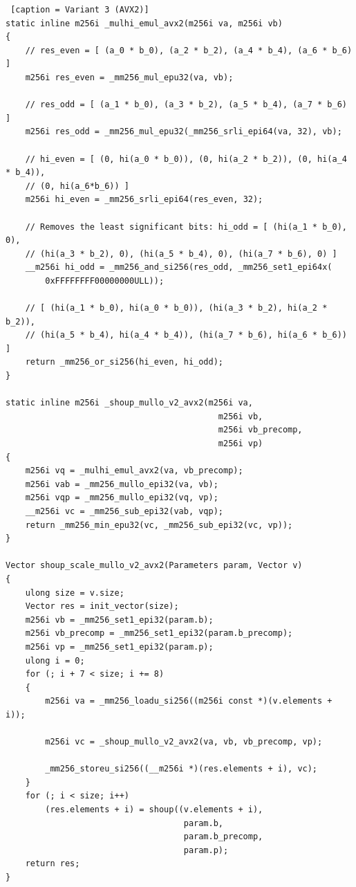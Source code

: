 \documentclass{article}
\begin{document}
\begin{lstlisting} [caption = Variant 3 (AVX2)]
static inline m256i _mulhi_emul_avx2(m256i va, m256i vb)
{
    // res_even = [ (a_0 * b_0), (a_2 * b_2), (a_4 * b_4), (a_6 * b_6) ]
    m256i res_even = _mm256_mul_epu32(va, vb);

    // res_odd = [ (a_1 * b_0), (a_3 * b_2), (a_5 * b_4), (a_7 * b_6) ]
    m256i res_odd = _mm256_mul_epu32(_mm256_srli_epi64(va, 32), vb);

    // hi_even = [ (0, hi(a_0 * b_0)), (0, hi(a_2 * b_2)), (0, hi(a_4 * b_4)),
    // (0, hi(a_6*b_6)) ]
    m256i hi_even = _mm256_srli_epi64(res_even, 32);

    // Removes the least significant bits: hi_odd = [ (hi(a_1 * b_0), 0),
    // (hi(a_3 * b_2), 0), (hi(a_5 * b_4), 0), (hi(a_7 * b_6), 0) ]
    __m256i hi_odd = _mm256_and_si256(res_odd, _mm256_set1_epi64x(
        0xFFFFFFFF00000000ULL));

    // [ (hi(a_1 * b_0), hi(a_0 * b_0)), (hi(a_3 * b_2), hi(a_2 * b_2)),
    // (hi(a_5 * b_4), hi(a_4 * b_4)), (hi(a_7 * b_6), hi(a_6 * b_6)) ]
    return _mm256_or_si256(hi_even, hi_odd);
}

static inline m256i _shoup_mullo_v2_avx2(m256i va,
                                           m256i vb,
                                           m256i vb_precomp,
                                           m256i vp)
{
    m256i vq = _mulhi_emul_avx2(va, vb_precomp);
    m256i vab = _mm256_mullo_epi32(va, vb);
    m256i vqp = _mm256_mullo_epi32(vq, vp);
    __m256i vc = _mm256_sub_epi32(vab, vqp);
    return _mm256_min_epu32(vc, _mm256_sub_epi32(vc, vp));
}

Vector shoup_scale_mullo_v2_avx2(Parameters param, Vector v)
{
    ulong size = v.size;
    Vector res = init_vector(size);
    m256i vb = _mm256_set1_epi32(param.b);
    m256i vb_precomp = _mm256_set1_epi32(param.b_precomp);
    m256i vp = _mm256_set1_epi32(param.p);
    ulong i = 0;
    for (; i + 7 < size; i += 8)
    {
        m256i va = _mm256_loadu_si256((m256i const *)(v.elements + i));

        m256i vc = _shoup_mullo_v2_avx2(va, vb, vb_precomp, vp);

        _mm256_storeu_si256((__m256i *)(res.elements + i), vc);
    }
    for (; i < size; i++)
        (res.elements + i) = shoup((v.elements + i),
                                    param.b,
                                    param.b_precomp,
                                    param.p);
    return res;
}
\end{lstlisting}
\end{document}
